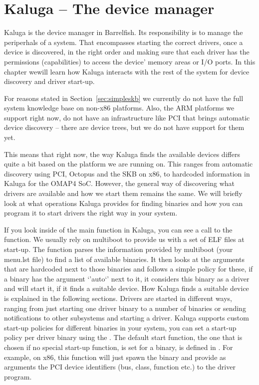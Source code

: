\documentclass[a4paper,11pt,twoside]{report}
\begin{document}
\section{Kaluga -- The device manager}

Kaluga is the device manager in Barrelfish. Its responsibility is to manage
the periperhals of a system. That encompasses starting the correct drivers,
once a device is discovered, in the right order and making sure that each driver
has the permissions (capabilities) to access the device' memory areas
or I/O ports. In this chapter wewill learn how Kaluga interacts with the
rest of the system for device discovery and driver start-up.

For reasons stated in Section~\ref{sec:simpleskb} we currently do not have the
full system knowledge base on non-x86 platforms. Also, the ARM platforms we
support right now, do not have an infrastructure like PCI that brings
automatic device discovery -- there are device trees, but we do not
have support for them yet.

This means that right now, the way Kaluga finds the available devices differs
quite a bit based on the platform we are running on. This ranges from
automatic discovery using PCI, Octopus and the SKB on x86, to hardcoded
information in Kaluga for the OMAP4 SoC. However, the general way of
discovering what drivers are available and how we start them remains the same.
We will briefly look at what operations Kaluga provides for finding binaries
and how you can program it to start drivers the right way in your system.

If you look inside of the main function in Kaluga, you can see a call to the
 function. We usually rely on multiboot to provide
us with a set of ELF files at start-up. The 
function parses the information provided by multiboot (your menu.lst file)  to
find a list of available binaries. It then looks at the arguments that are
hardcoded next to those binaries and follows a simple policy for these, if a
binary has the argument `'auto`' next to it, it considers this binary as a
driver and will start it, if it finds a suitable device. How Kaluga finds a
suitable device is explained in the following sections. Drivers are started in
different ways, ranging from just starting one driver binary to a number of
binaries or sending notifications to other subsystems and starting a driver.
Kaluga supports custom start-up policies for different binaries in your
system, you can set a start-up policy per driver binary using the
. The default start function, the one that is
chosen if no special start-up function, is set for a binary, is defined in
. For example, on x86, this function
will just spawn the binary and provide as arguments the PCI device identifiers
(bus, class, function etc.) to the driver program.
\end{document}

